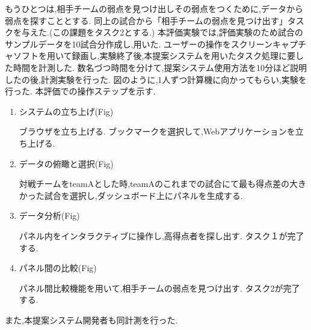 \documentclass[sotsuron]{kuee}
\begin{document}
					もうひとつは,相手チームの弱点を見つけ出しその弱点をつくために,データから弱点を探すこととする.
					同上の試合から「相手チームの弱点を見つけ出す」タスクを与えた.(この課題をタスク2とする.)
					本評価実験では,評価実験のため試合のサンプルデータを10試合分作成し,用いた.
					ユーザーの操作をスクリーンキャプチャソフトを用いて録画し,実験終了後,本提案システムを用いたタスク処理に要した時間を計測した.
					数名づつ時間を分けて,提案システム使用方法を10分ほど説明したの後,計測実験を行った.
					図のように,1人ずつ計算機に向かってもらい,実験を行った.
					本評価での操作ステップを示す.
					\begin{enumerate}
						\item システムの立ち上げ(Fig)
						
						ブラウザを立ち上げる.
						ブックマークを選択して,Webアプリケーションを立ち上げる.
						\item データの俯瞰と選択(Fig)
						
						対戦チームをteamAとした時,teamAのこれまでの試合にて最も得点差の大きかった試合を選択し,ダッシュボード上にパネルを生成する.
						\item データ分析(Fig)
						
						パネル内をインタラクティブに操作し,高得点者を探し出す.
						タスク１が完了する.
						\item パネル間の比較(Fig)
						
						パネル間比較機能を用いて,相手チームの弱点を見つけ出す.
						タスク2が完了する.
					\end{enumerate}
					また,本提案システム開発者も同計測を行った.
\end{document}
